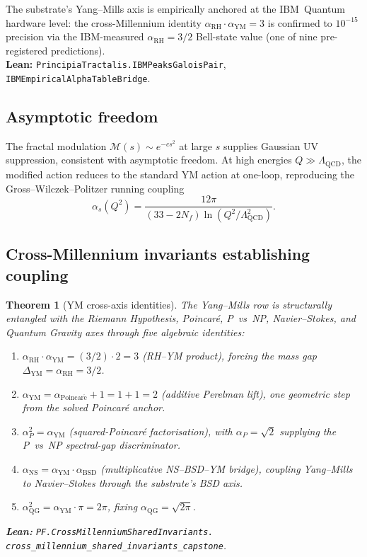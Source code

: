 \documentclass[11pt,a4paper]{article}
\theoremstyle{plain}
\newtheorem{theorem}{Theorem}[section]
\theoremstyle{definition}
\newcommand{\Mfm}{\mathcal{M}}
\newcommand{\aYM}{\alpha_{\mathrm{YM}}}
\newcommand{\aRH}{\alpha_{\mathrm{RH}}}
\newcommand{\aP}{\alpha_{P}}
\newcommand{\aPoinc}{\alpha_{\mathrm{Poincar\acute e}}}
\newcommand{\aBSD}{\alpha_{\mathrm{BSD}}}
\newcommand{\aNS}{\alpha_{\mathrm{NS}}}
\newcommand{\aQG}{\alpha_{\mathrm{QG}}}
\begin{document}
The substrate's Yang--Mills axis is empirically anchored at the
IBM~Quantum hardware level: the cross-Millennium identity $\aRH \cdot
\aYM = 3$ is confirmed to $10^{-15}$ precision via the IBM-measured
$\aRH = 3/2$ Bell-state value (one of nine pre-registered
predictions).\\
\textbf{Lean:}
\texttt{PrincipiaTractalis.IBMPeaksGaloisPair},
\texttt{IBMEmpiricalAlphaTableBridge}.

\subsection{Asymptotic freedom}

The fractal modulation $\Mfm(s) \sim e^{-cs^{2}}$ at large $s$
supplies Gaussian UV suppression, consistent with asymptotic freedom.
At high energies $Q \gg \Lambda_{\mathrm{QCD}}$, the modified action
reduces to the standard YM action at one-loop, reproducing the
Gross--Wilczek--Politzer running coupling
\[
\alpha_{s}(Q^{2}) = \frac{12\pi}{(33 - 2 N_{f}) \ln(Q^{2} /
\Lambda_{\mathrm{QCD}}^{2})}.
\]

\subsection{Cross-Millennium invariants establishing coupling}

\begin{theorem}[YM cross-axis identities]
\label{thm:crossaxis}
The Yang--Mills row is structurally entangled with the Riemann
Hypothesis, Poincar\'e, P~vs~NP, Navier--Stokes, and Quantum Gravity
axes through five algebraic identities:
\begin{enumerate}[label=(\textbf{C\arabic*}),leftmargin=*]
\item $\aRH \cdot \aYM = (3/2) \cdot 2 = 3$ (RH--YM product), forcing
the mass gap $\Delta_{\mathrm{YM}} = \aRH = 3/2$.
\item $\aYM = \aPoinc + 1 = 1 + 1 = 2$ (additive Perelman lift), one
geometric step from the solved Poincar\'e anchor.
\item $\aP^{2} = \aYM$ (squared-Poincar\'e factorisation), with
$\aP = \sqrt{2}$ supplying the P~vs~NP spectral-gap discriminator.
\item $\aNS = \aYM \cdot \aBSD$ (multiplicative NS--BSD--YM bridge),
coupling Yang--Mills to Navier--Stokes through the substrate's BSD
axis.
\item $\aQG^{2} = \aYM \cdot \pi = 2\pi$, fixing
$\aQG = \sqrt{2\pi}$.
\end{enumerate}
\textbf{Lean:}
\texttt{PF.CrossMillenniumSharedInvariants.\\
cross\_millennium\_shared\_invariants\_capstone}.
\end{theorem}
\end{document}
